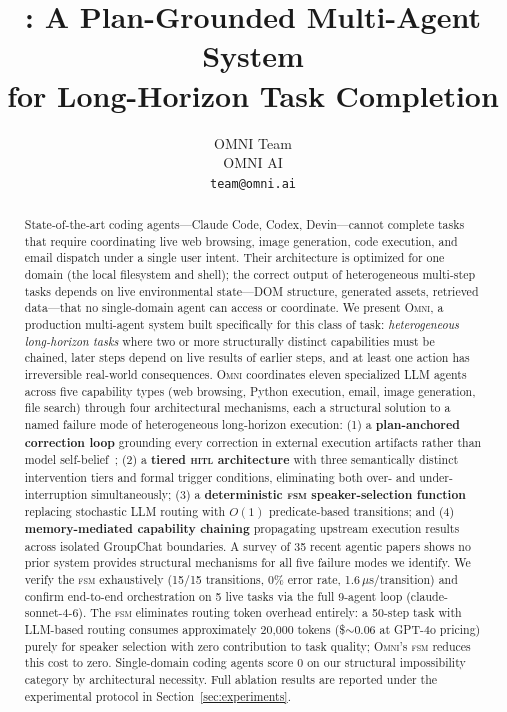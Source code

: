 \documentclass[11pt,a4paper]{article}
\title{\omni: A Plan-Grounded Multi-Agent System\\for Long-Horizon Task Completion}
\author{%
  OMNI Team \\
  OMNI AI \\
  \texttt{team@omni.ai}
}
\newcommand{\omni}{\textsc{Omni}}
\newcommand{\hitl}{\textsc{hitl}}
\newcommand{\fsm}{\textsc{fsm}}
\begin{document}
\maketitle

\begin{abstract}
State-of-the-art coding agents---Claude Code, Codex, Devin---cannot complete tasks that require coordinating live web browsing, image generation, code execution, and email dispatch under a single user intent. Their architecture is optimized for one domain (the local filesystem and shell); the correct output of heterogeneous multi-step tasks depends on live environmental state---DOM structure, generated assets, retrieved data---that no single-domain agent can access or coordinate. We present \omni{}, a production multi-agent system built specifically for this class of task: \emph{heterogeneous long-horizon tasks} where two or more structurally distinct capabilities must be chained, later steps depend on live results of earlier steps, and at least one action has irreversible real-world consequences. \omni{} coordinates eleven specialized LLM agents across five capability types (web browsing, Python execution, email, image generation, file search) through four architectural mechanisms, each a structural solution to a named failure mode of heterogeneous long-horizon execution: (1) a \textbf{plan-anchored correction loop} grounding every correction in external execution artifacts rather than model self-belief~\cite{huang2024llms}; (2) a \textbf{tiered \hitl{} architecture} with three semantically distinct intervention tiers and formal trigger conditions, eliminating both over- and under-interruption simultaneously; (3) a \textbf{deterministic \fsm{} speaker-selection function} replacing stochastic LLM routing with $O(1)$ predicate-based transitions; and (4) \textbf{memory-mediated capability chaining} propagating upstream execution results across isolated GroupChat boundaries. A survey of 35 recent agentic papers shows no prior system provides structural mechanisms for all five failure modes we identify. We verify the \fsm{} exhaustively (15/15 transitions, 0\% error rate, 1.6\,$\mu$s/transition) and confirm end-to-end orchestration on 5 live tasks via the full 9-agent loop (claude-sonnet-4-6). The \fsm{} eliminates routing token overhead entirely: a 50-step task with LLM-based routing consumes approximately 20{,}000 tokens (\$$\sim$0.06 at GPT-4o pricing) purely for speaker selection with zero contribution to task quality; \omni{}'s \fsm{} reduces this cost to zero. Single-domain coding agents score 0 on our structural impossibility category by architectural necessity. Full ablation results are reported under the experimental protocol in Section~\ref{sec:experiments}.
\end{abstract}
\end{document}

